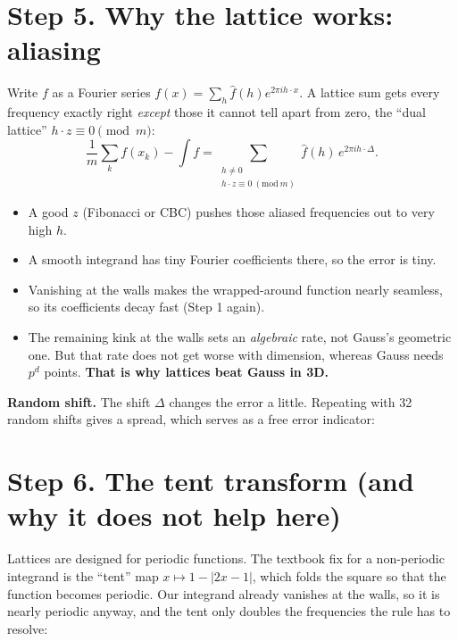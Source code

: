 \documentclass[11pt]{article}
\begin{document}
\section*{Step 5. Why the lattice works: aliasing}
Write $f$ as a Fourier series $f(x)=\sum_h \hat f(h)e^{2\pi i h\cdot x}$. A lattice sum gets every frequency exactly right
\emph{except} those it cannot tell apart from zero, the ``dual lattice'' $h\cdot z\equiv0 \pmod m$:
\[
\frac1m\sum_k f(x_k)-\int f=\sum_{\substack{h\ne0\\ h\cdot z\equiv 0\ (\mathrm{mod}\ m)}}\hat f(h)\,e^{2\pi i h\cdot\Delta}.
\]
\begin{itemize}
\item A good $z$ (Fibonacci or CBC) pushes those aliased frequencies out to very high $h$.
\item A smooth integrand has tiny Fourier coefficients there, so the error is tiny.
\item Vanishing at the walls makes the wrapped-around function nearly seamless, so its coefficients decay fast (Step 1 again).
\item The remaining kink at the walls sets an \emph{algebraic} rate, not Gauss's geometric one. But that rate does not get
worse with dimension, whereas Gauss needs $p^d$ points. \textbf{That is why lattices beat Gauss in 3D.}
\end{itemize}

\textbf{Random shift.} The shift $\Delta$ changes the error a little. Repeating with 32 random shifts gives a spread,
which serves as a free error indicator:
\begin{center}\end{center}

\section*{Step 6. The tent transform (and why it does not help here)}
Lattices are designed for periodic functions. The textbook fix for a non-periodic integrand is the ``tent'' map
$x\mapsto 1-|2x-1|$, which folds the square so that the function becomes periodic. Our integrand already vanishes at the
walls, so it is nearly periodic anyway, and the tent only doubles the frequencies the rule has to resolve:
\begin{center}\end{center}
\end{document}
